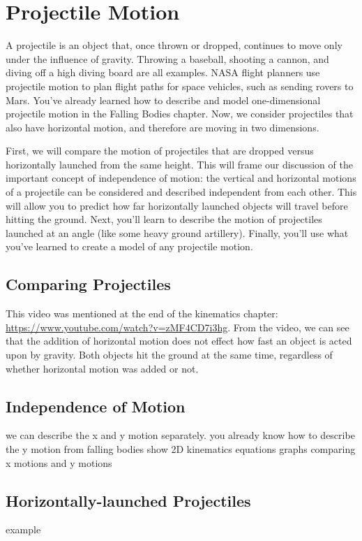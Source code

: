 \chapter{Projectile Motion}

A projectile is an object that, once thrown or dropped, continues to move only 
under the influence of gravity. Throwing a baseball, shooting a cannon, and 
diving off a high diving board are all examples. NASA flight planners use 
projectile motion to plan flight paths for space vehicles, such as sending 
rovers to Mars. You've already learned how to describe and model 
one-dimensional projectile motion in the Falling Bodies chapter. Now, we 
consider projectiles that also have horizontal motion, and therefore are 
moving in two dimensions. 

First, we will compare the motion of projectiles that are dropped versus 
horizontally launched from the same height. This will frame our discussion of 
the important concept of independence of motion: the vertical and horizontal 
motions of a projectile can be considered and described independent from each 
other. This will allow you to predict how far horizontally launched objects 
will travel before hitting the ground. Next, you'll learn to describe the 
motion of projectiles launched at an angle (like some heavy ground artillery). 
Finally, you'll use what you've learned to create a model of any projectile motion. 

\section{Comparing Projectiles}
This video was mentioned at the end of the kinematics chapter: \url{https://www.youtube.com/watch?v=zMF4CD7i3hg}.
From the video, we can see that the addition of horizontal motion does not effect how fast an object is acted upon by gravity. Both objects hit the ground at the same time, regardless of whether horizontal motion was added or not.


\section{Independence of Motion}
we can describe the x and y motion separately. 
you already know how to describe the y motion from falling bodies
show 2D kinematics equations
graphs comparing x motions and y motions

\section{Horizontally-launched Projectiles}
example

